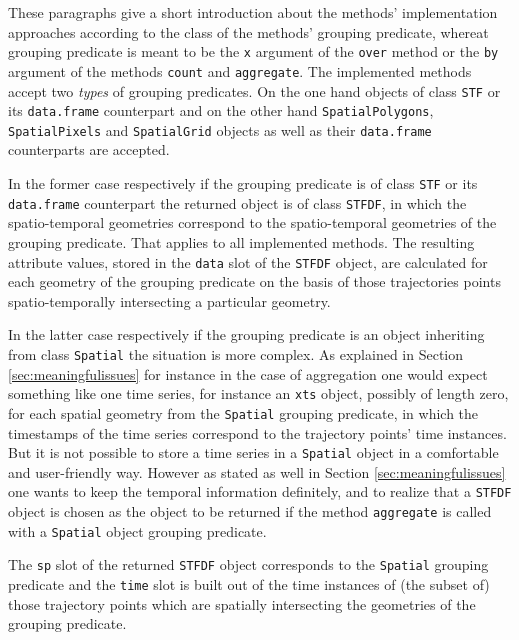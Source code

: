 \documentclass[12pt, oneside, a4paper]{scrbook}
\let\code=\texttt
\begin{document}
These paragraphs give a short introduction about the methods' implementation approaches according to the class of the methods' grouping predicate, whereat grouping predicate is meant to be the \code{x} argument of the \code{over} method or the \code{by} argument of the methods \code{count} and \code{aggregate}. The implemented methods accept two \textit{types} of grouping predicates. On the one hand objects of class \code{STF} or its \code{data.frame} counterpart and on the other hand \code{SpatialPolygons}, \code{SpatialPixels} and \code{SpatialGrid} objects as well as their \code{data.frame} counterparts are accepted.
\par\medskip
In the former case respectively if the grouping predicate is of class \code{STF} or its \code{data.frame} counterpart the returned object is of class \code{STFDF}, in which the spatio-temporal geometries correspond to the spatio-temporal geometries of the grouping predicate. 
That applies to all implemented methods.
The resulting attribute values, stored in the \code{data} slot of the \code{STFDF} object, are calculated for each geometry of the grouping predicate on the basis of those trajectories points spatio-temporally intersecting a particular geometry.
\par\medskip
In the latter case respectively if the grouping predicate is an object inheriting from class \code{Spatial} the situation is more complex.
As explained in Section \ref{sec:meaningfulissues} for instance in the case of aggregation one would expect something like one time series, for instance an \code{xts} object, possibly of length zero, for each spatial geometry from the \code{Spatial} grouping predicate, in which the timestamps of the time series correspond to the trajectory points' time instances.
But it is not possible to store a time series in a \code{Spatial} object in a comfortable and user-friendly way.
However as stated as well in Section \ref{sec:meaningfulissues} one wants to keep the temporal information definitely, and to realize that a \code{STFDF} object is chosen as the object to be returned if the method \code{aggregate} is called with a \code{Spatial} object grouping predicate.
\par\medskip
The \code{sp} slot of the returned \code{STFDF} object corresponds to the \code{Spatial} grouping predicate and the \code{time} slot is built out of the time instances of (the subset of) those trajectory points which are spatially intersecting the geometries of the grouping predicate.
\end{document}
